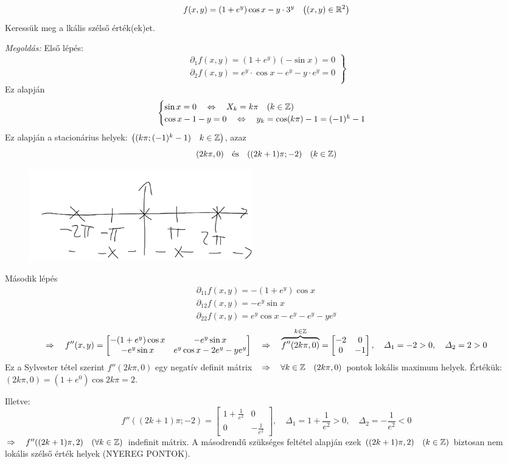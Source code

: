 \documentclass[a4paper,11.5pt]{article}
\begin{document}
	\begin{task}
		\[ f(x,y)=(1+e^y)\cos x-y\cdot 3^y\quad \big((x,y)\in\mathbb{R}^2 \big) \]
		Keressük meg a lkális szélső érték(ek)et.
		
		\textit{Megoldás:} Első lépés:
		\[\left.\begin{gathered}
			\partial_1f(x,y)=(1+e^y)(-\sin x)=0\\
			\partial_2f(x,y)=e^y\cdot\cos x-e^y-y\cdot e^y=0\\
		\end{gathered}\right\}  \]
		Ez alapján
		\[\begin{cases}
			\sin x=0\quad \Leftrightarrow\quad X_k=k\pi\quad (k\in\mathbb{Z})\\
			\cos x-1-y=0\quad \Leftrightarrow\quad y_k=\cos(k\pi)-1=(-1)^k-1
		\end{cases}\]
		Ez alapján a stacionárius helyek: $\big((k\pi; (-1)^k-1)\quad k\in\mathbb{Z}\big)$, azaz
		\[ (2k\pi,0)\quad \text{és}\quad ((2k+1)\pi; -2) \quad (k\in\mathbb{Z})\]
		\begin{figure}[H]
			\centering
			\includegraphics[height=4cm]{kepek/39.png}
			\caption{}
		\end{figure}
		Második lépés
		\begin{align*}
			\partial_{11}f(x,y)=-(1+e^y)\cos x\\
			\partial_{12}f(x,y)=-e^y\sin x\\
			\partial_{22}f(x,y)=e^y\cos x-e^y-e^y-ye^y
		\end{align*}
		\[ \Rightarrow\quad f''(x,y)=\begin{bmatrix}
			-(1+e^y)\cos x&-e^y\sin x\\
			-e^y\sin x&e^y\cos x-2e^y-ye^y
		\end{bmatrix}\quad \Rightarrow\quad \overbrace{f''(2k\pi,0)}^{k\in\mathbb{Z}}=\begin{bmatrix}
			-2&0\\
			0&-1
		\end{bmatrix},\quad \varDelta_1=-2>0, \quad \varDelta_2=2>0 \]
		Ez a Sylvester tétel szerint $f''(2k\pi,0)$ egy negatív definit mátrix$\quad \Rightarrow\quad \forall k\in\mathbb{Z} \quad (2k\pi,0)$ pontok lokális maximum helyek. Értékük: $(2k\pi,0)=(1+e^0)\cos2k\pi=2$.
		
		Illetve:
		\[f''((2k+1)\pi;-2)=\begin{bmatrix}
			1+\frac{1}{e^2}&0\\
			0&-\frac{1}{e^2}
		\end{bmatrix},\quad \varDelta_1=1+\frac{1}{e^2}>0,\quad \varDelta_2=-\frac{1}{e^2}<0 \]
		$\Rightarrow\quad f''((2k+1)\pi,2)\quad (\forall k\in\mathbb{Z})$ indefinit mátrix. A másodrendű szükséges feltétel alapján ezek $((2k+1)\pi,2)\quad (k\in\mathbb{Z})$ biztosan nem lokális szélső érték helyek (NYEREG PONTOK).
	\end{task}
\end{document}
